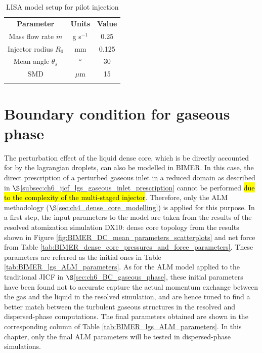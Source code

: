 

\begin{table}[!h]
\centering
\caption{LISA model setup for pilot injection}
\begin{tabular}{ccc}
\thickhline
\textbf{Parameter} & \textbf{Units} &  \textbf{Value} \\
\thickhline
Mass flow rate $\dot{m}$ & g s$^{-1}$ & 0.25 \\
Injector radius $R_0$ & mm & 0.125 \\
Mean angle $\overline{\theta}_s$ & $\degree$ & 30  \\
SMD & $\mu$m & 15 \\
\thickhline
\end{tabular}
\label{tab:LISA_model_parameters}
\end{table}




\section{Boundary condition for gaseous phase}
\label{sec:ch9_BIMER_BCs_for_gaseous_phase}

The perturbation effect of the liquid dense core, which is be directly accounted for by the lagrangian droplets, can also be modelled in BIMER. In this case, the direct prescription of a perturbed gaseous inlet in a reduced domain as described in $\S$\ref{subsec:ch6_jicf_lgs_gaseous_inlet_prescription} cannot be performed \hl{due to the complexity of the multi-staged injector}. Therefore, only the ALM methodology ($\S$\ref{sec:ch4_dense_core_modelling}) is applied for this purpose. In a first step, the input parameters to the model are taken from the results of the resolved atomization simulation DX10: dense core topology from the results shown in Figure \ref{fig:BIMER_DC_mean_parameters_scatterplots} and net force from Table \ref{tab:BIMER_dense_core_pressures_and_force_parameters}.  These parameters are referred as the initial ones in Table \ref{tab:BIMER_lgs_ALM_parameters}. As for the ALM model applied to the traditional JICF in $\S$\ref{sec:ch6_BC_gaseous_phase}, these initial parameters have been found not to accurate capture the actual momentum exchange between the gas and the liquid in the resolved simulation, and are hence tuned to find a better match between the turbulent gaseous structures in the resolved and dispersed-phase computations. The final parameters obtained are shown in the corresponding column of Table \ref{tab:BIMER_lgs_ALM_parameters}. In this chapter, only the final ALM parameters will be tested in dispersed-phase simulations.

